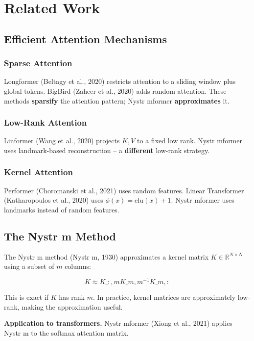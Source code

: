 
\section{Related Work}

\subsection{Efficient Attention Mechanisms}

\subsubsection{Sparse Attention}

Longformer (Beltagy et al., 2020) restricts attention to a sliding window 
plus global tokens. BigBird (Zaheer et al., 2020) adds random attention. 
These methods \textbf{sparsify} the attention pattern; Nystr mformer 
\textbf{approximates} it.

\subsubsection{Low-Rank Attention}

Linformer (Wang et al., 2020) projects $K, V$ to a fixed low rank. Nystr mformer 
uses landmark-based reconstruction -- a \textbf{different} low-rank strategy.

\subsubsection{Kernel Attention}

Performer (Choromanski et al., 2021) uses random features. Linear Transformer 
(Katharopoulos et al., 2020) uses $\phi(x) = \mathrm{elu}(x) + 1$. Nystr mformer 
uses landmarks instead of random features.

\subsection{The Nystr m Method}

The Nystr m method (Nystr m, 1930) approximates a kernel matrix $K \in \mathbb{R}^{N \times N}$ 
using a subset of $m$ columns:

\[
K \approx K\_{:, m} K\_{m, m}^{-1} K\_{m, :}
\tag{2.1}
\]

This is exact if $K$ has rank $m$. In practice, kernel matrices are 
approximately low-rank, making the approximation useful.

\textbf{Application to transformers.} Nystr mformer (Xiong et al., 2021) applies 
Nystr m to the softmax attention matrix.

